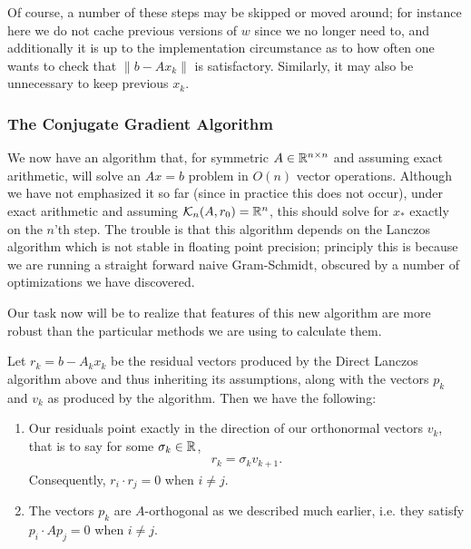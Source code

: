\documentclass[11pt]{article}
\begin{document}
Of course, a number of these steps may be skipped or moved around; for instance here we do not cache previous versions of $w$ since we no longer need to, and additionally it is up to the implementation circumstance as to how often one wants to check that $\lVert b - Ax_k \rVert$ is satisfactory. Similarly, it may also be unnecessary to keep previous $x_k$.

\subsubsection{The Conjugate Gradient Algorithm}

We now have an algorithm that, for symmetric $A \in \mathbb{R}^{n \times n}$ and assuming exact arithmetic, will solve an $Ax=b$ problem in $O(n)$ vector operations. Although we have not emphasized it so far (since in practice this does not occur), under exact arithmetic and assuming $\mathcal K_n (A,r_0) = \mathbb{R}^n$, this should solve for $x_*$ exactly on the $n$'th step. The trouble is that this algorithm depends on the Lanczos algorithm which is not stable in floating point precision; principly this is because we are running a straight forward naive Gram-Schmidt, obscured by a number of optimizations we have discovered.

Our task now will be to realize that features of this new algorithm are more robust than the particular methods we are using to calculate them.

\begin{proposition}
Let $r_k = b - A_k x_k$ be the residual vectors produced by the Direct Lanczos algorithm above and thus inheriting its assumptions, along with the vectors $p_k$ and $v_k$ as produced by the algorithm. Then we have the following: \begin{enumerate}
\item Our residuals point exactly in the direction of our orthonormal vectors $v_k$, that is to say for some $\sigma_k \in \mathbb{R}$, \begin{gather*}
r_k = \sigma_k v_{k+1}.
\end{gather*}
Consequently, $r_i \cdot r_j = 0$ when $i \neq j$.
\item The vectors $p_k$ are $A$-orthogonal as we described much earlier, i.e. they satisfy $p_i \cdot Ap_j = 0$ when $i \neq j$.
\end{enumerate}
\end{proposition}
\end{document}
